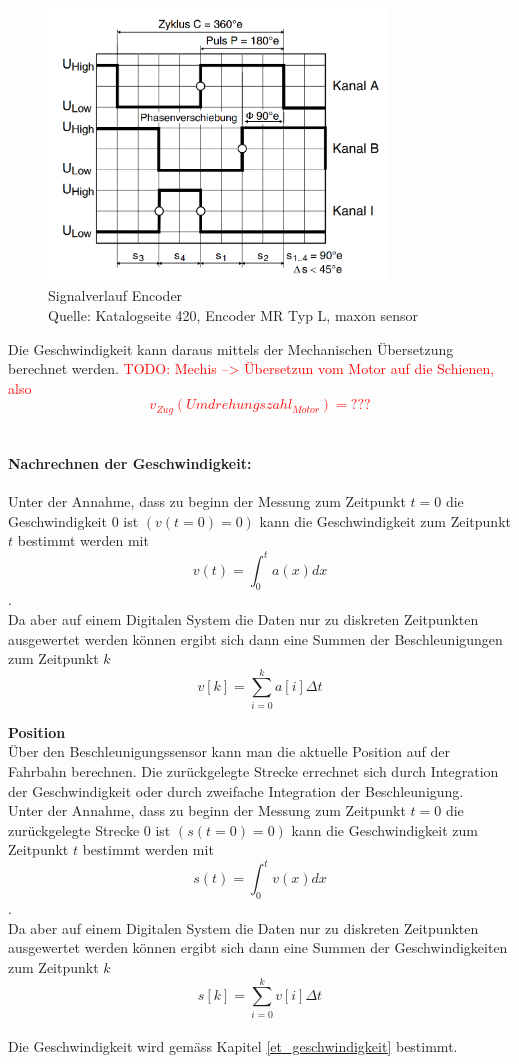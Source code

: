 \documentclass[../../main.tex]{subfiles}
\begin{document}
    \begin{figure}[H]
        \centering
        \includegraphics[width=0.8\textwidth]{Encoder_MR.png}
        \caption {Signalverlauf Encoder \\Quelle: Katalogseite 420, Encoder MR Typ L, maxon sensor}
        \label{fig:et_encoder}
    \end{figure}

    Die Geschwindigkeit kann daraus mittels der Mechanischen Übersetzung berechnet werden. 
    \textcolor{red}{TODO: Mechis --> Übersetzun vom Motor auf die Schienen, also $$v_{Zug}(Umdrehungszahl_{Motor}) = ???$$}\\

    \paragraph{Nachrechnen der Geschwindigkeit:}
    Unter der Annahme, dass zu beginn der Messung zum Zeitpunkt $t = 0$ die Geschwindigkeit $0$ ist $(v(t=0) = 0)$ kann die Geschwindigkeit zum Zeitpunkt $t$ bestimmt werden mit $$v(t) = \int_{0}^{t} a(x) dx$$.\\
    Da aber auf einem Digitalen System die Daten nur zu diskreten Zeitpunkten ausgewertet werden können ergibt sich dann eine Summen der Beschleunigungen zum Zeitpunkt $k$ $$v[k] = \sum_{i=0}^{k}a[i] \Delta t$$ 

    \textbf{Position}\\
    Über den Beschleunigungssensor kann man die aktuelle Position auf der Fahrbahn berechnen. Die zurückgelegte Strecke errechnet sich durch Integration der Geschwindigkeit oder durch zweifache Integration der Beschleunigung.\\
    Unter der Annahme, dass zu beginn der Messung zum Zeitpunkt $t = 0$ die zurückgelegte Strecke $0$ ist $(s(t=0) = 0)$ kann die Geschwindigkeit zum Zeitpunkt $t$ bestimmt werden mit $$s(t) = \int_{0}^{t} v(x) dx$$.\\
    Da aber auf einem Digitalen System die Daten nur zu diskreten Zeitpunkten ausgewertet werden können ergibt sich dann eine Summen der Geschwindigkeiten zum Zeitpunkt $k$ $$s[k] = \sum_{i=0}^{k}v[i] \Delta t$$\\
    Die Geschwindigkeit wird gemäss Kapitel \ref{et_geschwindigkeit} bestimmt.
\end{document}
